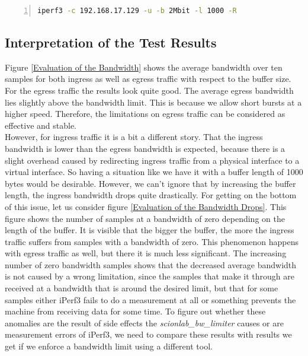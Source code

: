 \begin{lstlisting}[language=sh, caption = Example Ingress Test Command, captionpos=b, numbers=left, frame=single, breaklines=true, breakatwhitespace=true, showstringspaces=false, label=Example Ingress Test Command]
iperf3 -c 192.168.17.129 -u -b 2Mbit -l 1000 -R
\end{lstlisting}

\newpage

\subsection{Interpretation of the Test Results}

Figure \ref{Evaluation of the Bandwidth} shows the average bandwidth over ten samples for both ingress as well as egress traffic with respect to the buffer size. For the egress traffic the results look quite good. The average egress bandwidth lies slightly above the bandwidth limit. This is because we allow short bursts at a higher speed. Therefore, the limitations on egress traffic can be considered as effective and stable.
\\
However, for ingress traffic it is a bit a different story. That the ingress bandwidth is lower than the egress bandwidth is expected, because there is a slight overhead caused by redirecting ingress traffic from a physical interface to a virtual interface. So having a situation like we have it with a buffer length of 1000 bytes would be desirable. However, we can't ignore that by increasing the buffer length, the ingress bandwidth drops quite drastically. For getting on the bottom of this issue, let us consider figure \ref{Evaluation of the Bandwidth Drops}. This figure shows the number of samples at a bandwidth of zero depending on the length of the buffer. It is visible that the bigger the buffer, the more the ingress traffic suffers from samples with a bandwidth of zero. This phenomenon happens with egress traffic as well, but there it is much less significant. The increasing number of zero bandwidth samples shows that the decreased average bandwidth is not caused by a wrong limitation, since the samples that make it through are received at a bandwidth that is around the desired limit, but that for some samples either iPerf3 fails to do a measurement at all or something prevents the machine from receiving data for some time. To figure out whether these anomalies are the result of side effects the \textit{scionlab\_bw\_limiter} causes or are measurement errors of iPerf3, we need to compare these results with results we get if we enforce a bandwidth limit using a different tool.

